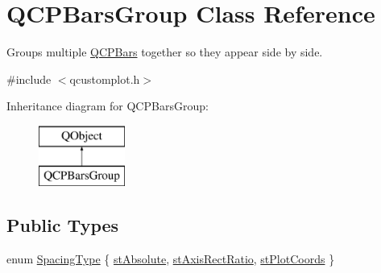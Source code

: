 \hypertarget{class_q_c_p_bars_group}{}\section{Q\+C\+P\+Bars\+Group Class Reference}
\label{class_q_c_p_bars_group}


Groups multiple \mbox{\hyperlink{class_q_c_p_bars}{Q\+C\+P\+Bars}} together so they appear side by side.  




{\ttfamily \#include $<$qcustomplot.\+h$>$}

Inheritance diagram for Q\+C\+P\+Bars\+Group\+:\begin{figure}[H]
\begin{center}
\leavevmode
\includegraphics[height=2.000000cm]{d3/d76/class_q_c_p_bars_group}
\end{center}
\end{figure}
\subsection*{Public Types}
\begin{DoxyCompactItemize}
\item 
enum \mbox{\hyperlink{class_q_c_p_bars_group_a4c0521120a97e60bbca37677a37075b6}{Spacing\+Type}} \{ \mbox{\hyperlink{class_q_c_p_bars_group_a4c0521120a97e60bbca37677a37075b6ab53fa3efaf14867dd0f14d41d64e42ac}{st\+Absolute}}, 
\mbox{\hyperlink{class_q_c_p_bars_group_a4c0521120a97e60bbca37677a37075b6ae94b05c27bc985dcdd8b1e1b7f163d26}{st\+Axis\+Rect\+Ratio}}, 
\mbox{\hyperlink{class_q_c_p_bars_group_a4c0521120a97e60bbca37677a37075b6ad369cee6287e0a86e8c2b643a3168c54}{st\+Plot\+Coords}}
 \}
\end{DoxyCompactItemize}
